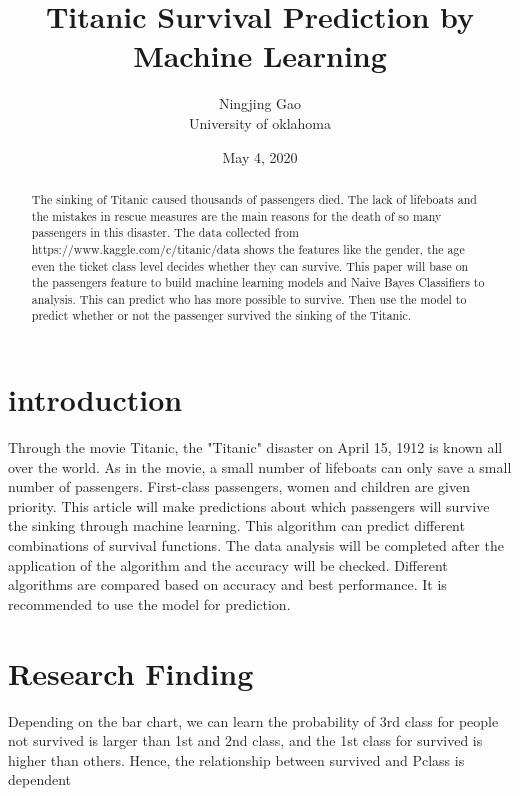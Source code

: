 \documentclass[12pt,english]{article}
\begin{document}
\begin{singlespace}
\title{Titanic Survival Prediction by Machine Learning}
\end{singlespace}

\author{Ningjing Gao\\University of oklahoma}
\date{May 4, 2020}

\maketitle

\begin{abstract}

	The sinking of Titanic caused thousands of passengers died.  The lack of lifeboats and the mistakes in rescue measures are the main reasons for the death of so many passengers in this disaster. The data collected from https://www.kaggle.com/c/titanic/data shows the features like the gender, the age even the ticket class level decides whether they can survive. This paper will base on the passengers feature to build machine learning models and Naive Bayes Classifiers to analysis. This can predict who has more possible to survive. Then use the model to predict whether or not the passenger survived the sinking of the Titanic.

\end{abstract}
\section{introduction}
Through the movie Titanic, the "Titanic" disaster on April 15, 1912 is known all over the world. As in the movie, a small number of lifeboats can only save a small number of passengers. First-class passengers, women and children are given priority. This article will make predictions about which passengers will survive the sinking through machine learning. This algorithm can predict different combinations of survival functions. The data analysis will be completed after the application of the algorithm and the accuracy will be checked. Different algorithms are compared based on accuracy and best performance. It is recommended to use the model for prediction.

\section{Research Finding }


Depending on the bar chart, we can learn the probability of 3rd class for people not survived is larger than 1st and  2nd class, and the 1st class for survived is higher than others. Hence, the relationship between survived and Pclass is dependent
\end{document}
